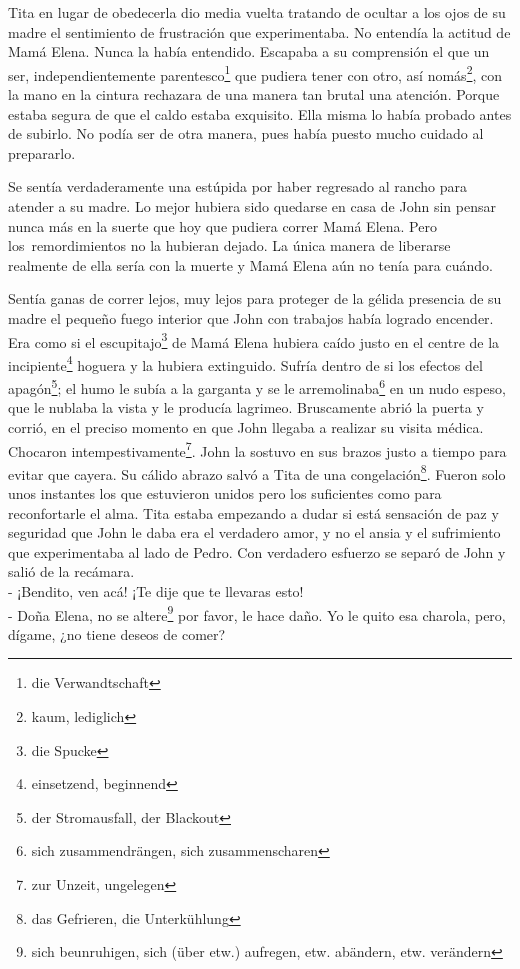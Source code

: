 Tita en lugar de obedecerla dio media vuelta tratando de ocultar a los
ojos de su madre el sentimiento de frustración que experimentaba. No
entendía la actitud de Mamá Elena. Nunca la había entendido. Escapaba a
su comprensión el que un ser, independientemente parentesco\footnote{die Verwandtschaft}
que pudiera tener con otro, así nomás\footnote{kaum, lediglich},
con la mano en la cintura rechazara de una manera tan brutal una atención.
Porque estaba segura de que el caldo estaba exquisito. Ella misma lo había
probado antes de subirlo. No podía ser de otra manera, pues había puesto
mucho cuidado al prepararlo.

Se sentía verdaderamente una estúpida por haber regresado al rancho
para atender a su madre. Lo mejor hubiera sido quedarse en casa de John
sin pensar nunca más en la suerte que hoy que pudiera correr Mamá Elena.
Pero los~remordimientos no la hubieran dejado. La única manera de
liberarse realmente de ella sería con la muerte y Mamá Elena aún no
tenía para cuándo.

Sentía ganas de correr lejos, muy lejos para proteger de la gélida
presencia de su madre el pequeño fuego interior que John con trabajos
había logrado encender. Era como si el escupitajo\footnote{die Spucke}
de Mamá Elena hubiera caído justo en el centre de la incipiente\footnote{einsetzend, beginnend}
hoguera y la hubiera extinguido. Sufría dentro de si los efectos del apagón\footnote{der Stromausfall, der Blackout}; el humo le subía
a la garganta y se le arremolinaba\footnote{sich zusammendrängen, sich zusammenscharen}
en un nudo espeso, que le nublaba la vista y le producía lagrimeo.
Bruscamente abrió la puerta y corrió, en el preciso momento en que
John llegaba a realizar su visita médica. Chocaron intempestivamente\footnote{zur Unzeit, ungelegen}.
John la sostuvo en sus brazos justo a tiempo para evitar que cayera.
Su cálido abrazo salvó a Tita de una congelación\footnote{das Gefrieren, die Unterkühlung}.
Fueron solo unos instantes los que estuvieron unidos pero los suficientes
como para reconfortarle
el alma. Tita estaba empezando a dudar si está sensación
de paz y seguridad que John le daba era el verdadero amor, y no el ansia
y el sufrimiento que experimentaba al lado de Pedro. Con verdadero
esfuerzo se separó de John y salió de la recámara.
\\- ¡Bendito, ven acá! ¡Te dije que te llevaras esto! %
\\- Doña Elena, no se altere\footnote{sich beunruhigen, sich (über etw.) aufregen, etw. abändern, etw. verändern} %
por favor, le hace daño. Yo le quito esa charola, pero, dígame, ¿no tiene deseos de comer?\\

